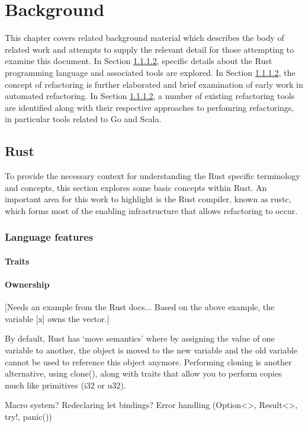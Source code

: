 \chapter{Background}\label{C:back} 
This chapter covers related background material which describes the body of related work and attempts to supply the relevant detail for those attempting to examine this document. In Section \ref{}, specific details about the Rust programming language and associated tools are explored. In Section \ref{}, the concept of refactoring is further elaborated and brief examination of early work in automated refactoring. In Section \ref{}, a number of existing refactoring tools are identified along with their respective approaches to perfomring refactorings, in particular tools related to Go and Scala. 

\section{Rust}
To provide the necessary context for understanding the Rust specific terminology and concepts, this section explores some basic concepts within Rust. An important area for this work to highlight is the Rust compiler, known as rustc, which forms most of the enabling infrastructure that allows refactoring to occur.

\subsection{Language features}

\subsubsection{Traits}

\subsubsection{Ownership}
[Needs an example from the Rust docs... Based on the above example, the variable [x] owns the vector.]

By default, Rust has `move semantics' where by assigning the value of one variable to another, the object is moved to the new variable and the old variable cannot be used to reference this object anymore. Performing cloning is another alternative, using clone(), along with traits that allow you to perform copies much like primitives (i32 or u32).

Macro system?
Redeclaring let bindings?
Error handling (Option<>, Result<>, try!, panic())

